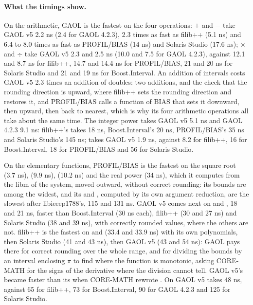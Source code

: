 \documentclass[12pt,a4paper,twoside,openright]{book}
\begin{document}
\paragraph{What the timings show.}
On the arithmetic, GAOL is the fastest on the four operations: $+$ and $-$
take GAOL v5 2.2 ns (2.4 for GAOL 4.2.3), 2.3 times as fast as filib++
(5.1 ns) and 6.4 to 8.0 times as fast as PROFIL/BIAS (14 ns) and Solaris
Studio (17.6 ns); $\times$ and $\div$ take GAOL v5 2.3 and 2.5 ns (10.0 and
7.5 for GAOL 4.2.3), against 12.1 and 8.7 ns for filib++, 14.7 and 14.4 ns
for PROFIL/BIAS, 21 and 20 ns for Solaris Studio and 21 and 19 ns for
Boost.Interval. An addition of intervals costs GAOL v5 2.3 times an
addition of doubles: two additions, and the check that the rounding
direction is upward, where filib++ sets the rounding direction and restores
it, and PROFIL/BIAS calls a function of BIAS that sets it downward, then
upward, then back to nearest, which is why its four arithmetic operations
all take about the same time. The integer power  takes
GAOL v5 5.1 ns and GAOL 4.2.3 9.1 ns: filib++'s  takes
18 ns, Boost.Interval's 20 ns, PROFIL/BIAS's 35 ns and Solaris Studio's
 145 ns;  takes GAOL v5 1.9 ns, against 8.2 for
filib++, 16 for Boost.Interval, 18 for PROFIL/BIAS and 56 for Solaris
Studio.

\medskip
On the elementary functions, PROFIL/BIAS is the fastest on the square root
(3.7 ns),  (9.9 ns),  (10.2 ns) and the real power
 (34 ns), which it computes from the libm of the system,
moved outward, without correct rounding: its bounds are among the widest,
and its  and , computed by its own argument reduction,
are the slowest after libieeep1788's, 115 and 131 ns. GAOL v5 comes next on
 and , 18 and 21 ns, faster than Boost.Interval (30 ns
each), filib++ (30 and 27 ns) and Solaris Studio (38 and 39 ns), with
correctly rounded values, where the others are not. filib++ is the fastest
on  and  (33.4 and 33.9 ns) with its own polynomials,
then Solaris Studio (41 and 43 ns), then GAOL v5 (43 and 54 ns): GAOL pays
there for correct rounding over the whole range, and for dividing the bounds
by an interval enclosing $\pi$ to find where the function is monotonic,
asking CORE-MATH for the signs of the derivative where the division cannot
tell. GAOL v5's  became faster than its  when CORE-MATH
rewrote . On  GAOL v5 takes 48 ns, against 65
for filib++, 73 for Boost.Interval, 90 for GAOL 4.2.3 and 125 for Solaris
Studio.
\end{document}
